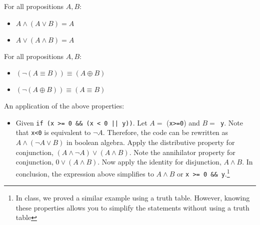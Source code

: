 \bigskip
\begin{proposition}
    For all propositions \(A,B\):
    \begin{itemize}
        \item \(A\land(A\lor B)=A\)
        \item \(A\lor(A\land B)=A\)
    \end{itemize}
\end{proposition}

\bigskip
\begin{proposition}
    For all propositions \(A,B\):
    \begin{itemize}
        \item \((\lnot(A\equiv B))\equiv (A\oplus B)\)
        \item \((\lnot(A\oplus B))\equiv (A\equiv B)\)
    \end{itemize}    
\end{proposition}

\bigskip
An application of the above properties:
\begin{itemize}
    \item Given \texttt{if (x >= 0 \&\& (x < 0 || y))}. Let \(A=\) (\texttt{x>=0}) and \(B=\)\texttt{ y}. Note that \texttt{x<0} is equivalent to \(\lnot A\).
    Therefore, the code can be rewritten as \(A\land(\lnot A\lor B)\) in boolean algebra. Apply the distributive property for conjunction,
    \((A\land\lnot A)\lor(A\land B)\). Note the annihilator property for conjunction, \(0\lor(A\land B)\). Now apply the identity for disjunction,
    \(A\land B\). In conclusion, the expression above simplifies to \(A\land B\) or \texttt{x >= 0 \&\& y}.\footnote{In class, we proved a similar example
    using a truth table. However, knowing these properties allows you to simplify the statements without using a truth table}
\end{itemize}